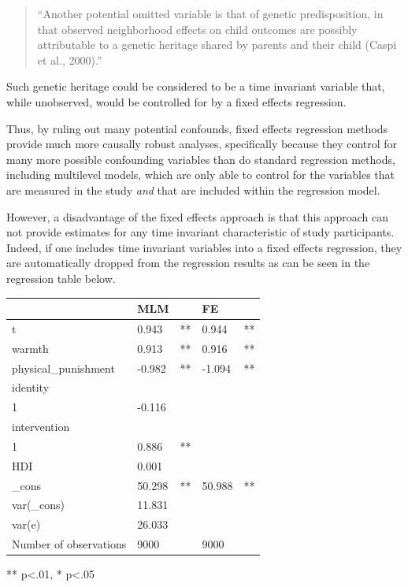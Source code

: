 \documentclass[
  letterpaper,
  DIV=11,
  numbers=noendperiod]{scrreprt}
\begin{document}
\begin{quote}
``Another potential omitted variable is that of genetic predisposition,
in that observed neighborhood effects on child outcomes are possibly
attributable to a genetic heritage shared by parents and their child
(Caspi et al., 2000).''
\end{quote}

Such genetic heritage could be considered to be a time invariant
variable that, while unobserved, would be controlled for by a fixed
effects regression.

Thus, by ruling out many potential confounds, fixed effects regression
methods provide much more causally robust analyses, specifically because
they control for many more possible confounding variables than do
standard regression methods, including multilevel models, which are only
able to control for the variables that are measured in the study
\emph{and} that are included within the regression model.

However, a disadvantage of the fixed effects approach is that this
approach can not provide estimates for any time invariant characteristic
of study participants. Indeed, if one includes time invariant variables
into a fixed effects regression, they are automatically dropped from the
regression results as can be seen in the regression table below.

\begin{longtable}[]{@{}lllll@{}}
\toprule\noalign{}
& MLM & & FE & \\
\midrule\noalign{}
\endhead
\bottomrule\noalign{}
\endlastfoot
t & 0.943 & ** & 0.944 & ** \\
warmth & 0.913 & ** & 0.916 & ** \\
physical\_punishment & -0.982 & ** & -1.094 & ** \\
identity & & & & \\
1 & -0.116 & & & \\
intervention & & & & \\
1 & 0.886 & ** & & \\
HDI & 0.001 & & & \\
\_cons & 50.298 & ** & 50.988 & ** \\
var(\_cons) & 11.831 & & & \\
var(e) & 26.033 & & & \\
Number of observations & 9000 & & 9000 & \\
\end{longtable}

** p\textless.01, * p\textless.05
\end{document}
